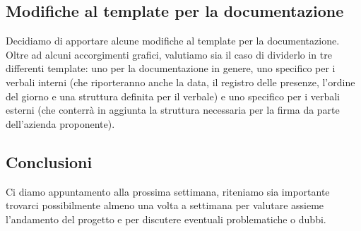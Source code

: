 \documentclass[italian,12pt]{article} %
\begin{document}
\subsection{Modifiche al template per la documentazione}
Decidiamo di apportare alcune modifiche al template per la documentazione. \\
Oltre ad alcuni accorgimenti grafici, valutiamo sia il caso di dividerlo
in tre differenti template: uno per la documentazione in genere, uno specifico per i verbali interni (che riporteranno anche la data, il registro delle presenze, l'ordine del giorno e una struttura definita per il verbale) e uno specifico per i verbali esterni (che conterrà in aggiunta la struttura necessaria per la firma da parte dell'azienda proponente).

\subsection{Conclusioni}
Ci diamo appuntamento alla prossima settimana, riteniamo sia
importante trovarci possibilmente almeno una volta a settimana per valutare assieme
l'andamento del progetto e per discutere eventuali problematiche o dubbi.
\end{document}
